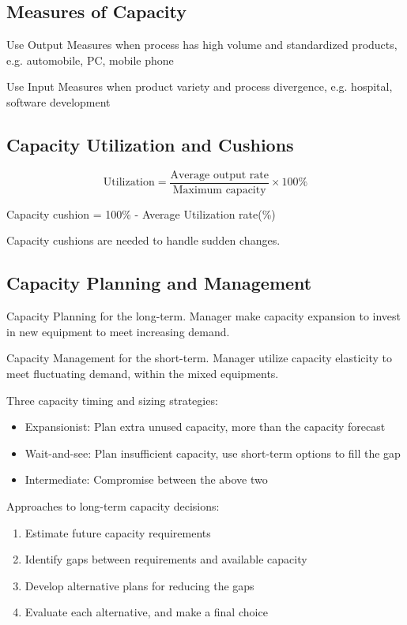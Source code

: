 \documentclass{article}
\newcommand{\red}[1]{\color{red}#1\color{black}\xspace}
\begin{document}
\subsection{Measures of Capacity}

Use Output Measures when process has high volume and standardized products,
e.g. automobile, PC, mobile phone

Use Input Measures when product variety and process divergence,
e.g. hospital, software development

\subsection{Capacity Utilization and Cushions}

\[
	\text{Utilization} = \dfrac{
		\text{Average output rate}
	}{
		\text{Maximum capacity}
	} \times 100\%
\]

\begin{center}
	Capacity cushion = 100\% - Average Utilization rate(\%)
\end{center}

Capacity cushions are needed to handle sudden changes.

\subsection{Capacity Planning and Management}

Capacity Planning for the long-term.
Manager \red{make capacity expansion} to invest in new equipment to meet increasing demand.

Capacity Management for the short-term.
Manager \red{utilize capacity elasticity} to meet fluctuating demand,
within the mixed equipments.

Three capacity timing and sizing strategies:
\begin{itemize}
	\item Expansionist: Plan extra unused capacity, more than the capacity forecast
	\item Wait-and-see: Plan insufficient capacity, use short-term options to fill the gap
	\item Intermediate: Compromise between the above two
\end{itemize}

Approaches to long-term capacity decisions:
\begin{enumerate}
	\item Estimate future capacity requirements
	\item Identify gaps between requirements and available capacity
	\item Develop alternative plans for reducing the gaps
	\item Evaluate each alternative, and make a final choice
\end{enumerate}
\end{document}
